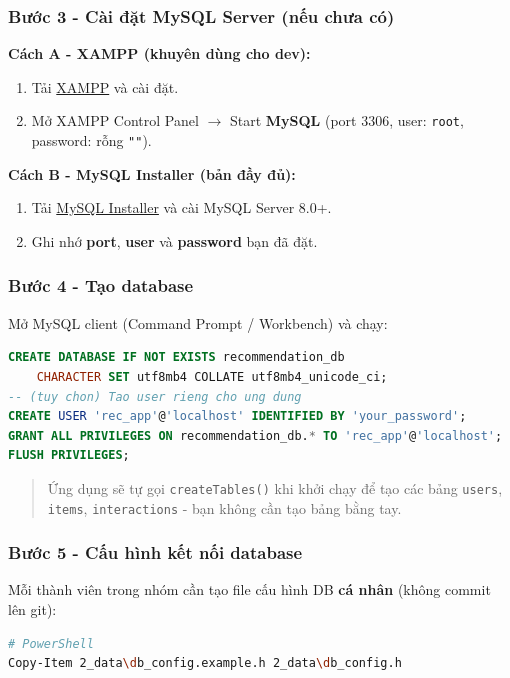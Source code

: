 \documentclass{report}
\begin{document}
\subsubsection*{Bước 3 - Cài đặt MySQL Server (nếu chưa có)}

\textbf{Cách A - XAMPP (khuyên dùng cho dev):}
\begin{enumerate}
    \item Tải \href{https://www.apachefriends.org/}{XAMPP} và cài đặt.
    \item Mở XAMPP Control Panel $\rightarrow$ Start \textbf{MySQL} (port 3306, user: \texttt{root}, password: rỗng \texttt{""}).
\end{enumerate}

\textbf{Cách B - MySQL Installer (bản đầy đủ):}
\begin{enumerate}
    \item Tải \href{https://dev.mysql.com/downloads/installer/}{MySQL Installer} và cài MySQL Server 8.0+.
    \item Ghi nhớ \textbf{port}, \textbf{user} và \textbf{password} bạn đã đặt.
\end{enumerate}

\subsubsection*{Bước 4 - Tạo database}

Mở MySQL client (Command Prompt / Workbench) và chạy:
\begin{lstlisting}[language=SQL, style=cppstyle, caption={Tạo database}]
CREATE DATABASE IF NOT EXISTS recommendation_db
    CHARACTER SET utf8mb4 COLLATE utf8mb4_unicode_ci;
-- (tuy chon) Tao user rieng cho ung dung
CREATE USER 'rec_app'@'localhost' IDENTIFIED BY 'your_password';
GRANT ALL PRIVILEGES ON recommendation_db.* TO 'rec_app'@'localhost';
FLUSH PRIVILEGES;
\end{lstlisting}

\begin{quote}
Ứng dụng sẽ tự gọi \texttt{createTables()} khi khởi chạy để tạo các bảng \texttt{users}, \texttt{items}, \texttt{interactions} - bạn không cần tạo bảng bằng tay.
\end{quote}

\subsubsection*{Bước 5 - Cấu hình kết nối database}

Mỗi thành viên trong nhóm cần tạo file cấu hình DB \textbf{cá nhân} (không commit lên git):
\begin{lstlisting}[language=bash, style=cppstyle, caption={Sao chép file cấu hình DB}]
# PowerShell
Copy-Item 2_data\db_config.example.h 2_data\db_config.h
\end{lstlisting}
\end{document}

